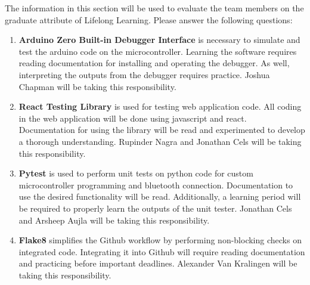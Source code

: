 \documentclass[12pt, titlepage]{article}
\begin{document}
The information in this section will be used to evaluate the team members on the
graduate attribute of Lifelong Learning.  Please answer the following questions:

\begin{enumerate}
  \item \textbf{Arduino Zero Built-in Debugger Interface} is 
  necessary to simulate and test the arduino code on the microcontroller. 
  Learning the software requires reading documentation for installing 
  and operating the debugger. As well, interpreting the outputs from 
  the debugger requires practice. Joshua Chapman will be taking this
  responsibility.
  \item \textbf{React Testing Library} is used for testing web 
  application code. All coding in the web application will be done 
  using javascript and react. Documentation for using the library will be read
  and experimented to develop a thorough understanding.
   Rupinder Nagra and Jonathan Cels will be taking this responsibility. 
  \item \textbf{Pytest} is used to perform unit tests on python code
  for custom microcontroller programming and bluetooth connection. Documentation to 
  use the desired functionality will be read. Additionally, a learning period will 
  be required to properly learn the outputs of the unit tester. 
  Jonathan Cels and Arsheep Aujla will be taking this responsibility.
  \item \textbf{Flake8} simplifies the Github workflow by performing non-blocking 
  checks on integrated code. Integrating it into Github will require reading 
  documentation and practicing before important deadlines. Alexander Van Kralingen 
  will be taking this responsibility.
\end{enumerate}
\end{document}
